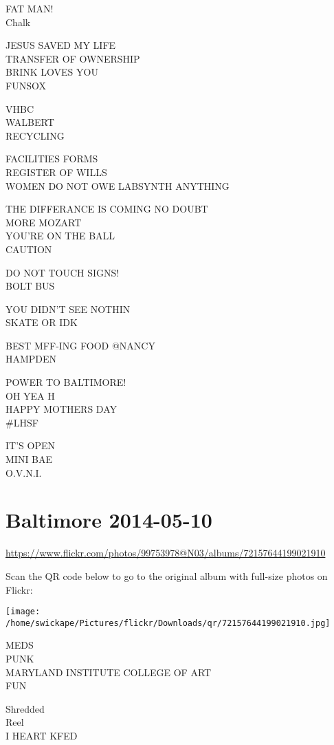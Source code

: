 \documentclass[10pt,letterpaper]{article}
\begin{document}
FAT MAN!\\
Chalk

JESUS SAVED MY LIFE\\
TRANSFER OF OWNERSHIP\\
BRINK LOVES YOU\\
FUNSOX

VHBC\\
WALBERT\\
RECYCLING

FACILITIES FORMS\\
REGISTER OF WILLS\\
WOMEN DO NOT OWE LABSYNTH ANYTHING

THE DIFFERANCE IS COMING NO DOUBT\\
MORE MOZART\\
YOU'RE ON THE BALL\\
CAUTION

DO NOT TOUCH SIGNS!\\
BOLT BUS

YOU DIDN'T SEE NOTHIN\\
SKATE OR IDK

BEST MFF{-}ING FOOD @NANCY\\
HAMPDEN

POWER TO BALTIMORE!\\
OH YEA H\\
HAPPY MOTHERS DAY\\
\#LHSF

IT'S OPEN\\
MINI BAE\\
O.V.N.I.
\pagebreak

\section*{Baltimore 2014-05-10}

\url{https://www.flickr.com/photos/99753978@N03/albums/72157644199021910}

Scan the QR code below to go to the original album with full-size photos on Flickr:

\texttt{[image: /home/swickape/Pictures/flickr/Downloads/qr/72157644199021910.jpg]}
\pagebreak

MEDS\\
PUNK\\
MARYLAND INSTITUTE COLLEGE OF ART\\
FUN

Shredded\\
Reel\\
I HEART KFED
\end{document}
